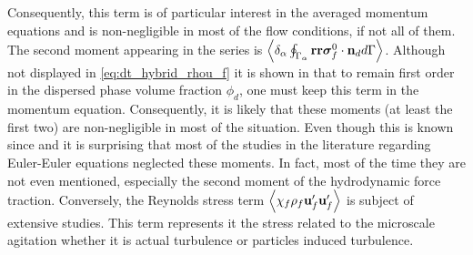 Consequently, this term is of particular interest in the averaged momentum equations and is non-negligible in most of the flow conditions, if not all of them.
The second moment appearing in the series is $\left<\delta_\alpha \oint_{\Gamma_\alpha} \textbf{rr}\bm{\sigma}_f^0 \cdot \textbf{n}_d d\Gamma\right>$. 
Although not displayed in \ref{eq:dt_hybrid_rhou_f} it is shown in \citet{jackson1997locally,zhang1997momentum} that to remain first order in the dispersed phase volume fraction $\phi_d$, one must keep this term in the momentum equation. 
Consequently, it is likely that these moments (at least the first two) are non-negligible in most of the situation. 
Even though this is known since \citet{jackson1997locally} and \citet{zhang1997momentum} it is surprising that most of the studies in the literature regarding Euler-Euler equations neglected these moments. 
In fact, most of the time they are not even mentioned, especially the second moment of the hydrodynamic force traction. 
Conversely, the Reynolds stress term $\left<\chi_f \rho_f \textbf{u}_f'\textbf{u}_f'\right>$  is subject of extensive studies. 
This term represents it the stress related to the microscale agitation whether it is actual turbulence or particles induced turbulence. 

